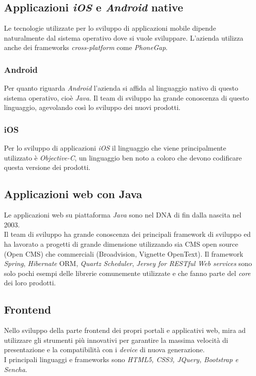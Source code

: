 \subsection{Applicazioni \emph{iOS} e \emph{Android} native}
Le tecnologie utilizzate per lo sviluppo di applicazioni mobile dipende naturalmente dal sistema operativo dove si vuole sviluppare. L'azienda utilizza anche dei \glspl{framework} \emph{cross-platform} come \emph{PhoneGap}.
\subsubsection{Android}
Per quanto riguarda \emph{Android} l'azienda si affida al linguaggio nativo di questo sistema operativo, cioè \emph{Java}. 
Il team di sviluppo ha grande conoscenza di questo linguaggio, agevolando così lo sviluppo dei nuovi prodotti.
\subsubsection{iOS}
Per lo sviluppo di applicazioni \emph{iOS} il linguaggio che viene principalmente utilizzato è \emph{Objective-C}, un linguaggio ben noto a coloro che devono codificare questa versione dei prodotti.

\subsection{Applicazioni web con Java}
Le applicazioni web su piattaforma \emph{Java} sono nel DNA di \azienda{} fin dalla nascita nel 2003. \\
Il team di sviluppo ha grande conoscenza dei principali \gls{framework} di sviluppo ed ha lavorato a progetti di grande dimensione utilizzando sia CMS \gls{open source} (Open CMS) che commerciali (Broadvision, Vignette OpenText).
Il \gls{framework} \emph{Spring}, \emph{Hibernate} \gls{ORM}, \emph{Quartz Scheduler},\emph{ Jersey for RESTful Web services} sono solo pochi esempi delle librerie comunemente utilizzate e che fanno parte del \emph{core} dei loro prodotti.

\subsection{Frontend}
Nello sviluppo della parte \gls{frontend} dei propri portali e applicativi web, \azienda{} mira ad utilizzare gli strumenti più innovativi per garantire la massima velocità di presentazione e la compatibilità con i \emph{device} di nuova generazione. \\
I principali linguaggi e \glspl{framework} sono \emph{HTML5, CSS3, JQuery, Bootstrap e Sencha}.

